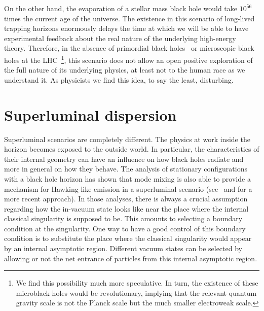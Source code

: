 \documentclass[11pt,a4paper]{article}
\begin{document}
On the other hand, the evaporation of a stellar mass black hole would take $10^{56}$
times the current age of the universe. The existence in this scenario of long-lived
trapping horizons enormously delays the time at which we will be able to have
experimental feedback about the real nature of the underlying high-energy theory.
Therefore, in the absence of primordial black holes~\cite{Carr:2009jm} or
microscopic black holes at the LHC~\cite{Khachatryan:2010wx}\footnote{We find this
possibility much more speculative. In turn, the existence of these microblack holes
would be revolutionary, implying that the relevant quantum gravity scale is not the
Planck scale but the much smaller electroweak scale.}, this scenario does not allow
an open positive exploration of the full nature of its underlying physics, at least
not to the human race as we understand it. As physicists we find this idea, to say
the least, disturbing.

\section{Superluminal dispersion}
\label{Sec:Super}
    
Superluminal scenarios are completely different. 
The physics at work inside the horizon becomes exposed to the outside world.
In particular, the characteristics of their internal geometry can have 
an influence on how black holes radiate and more in general on how they behave.
The analysis of stationary configurations with a black hole horizon has shown that
mode mixing is also able to provide a mechanism for Hawking-like emission in a
superluminal scenario (see~\cite{Corley:1997pr} and \cite{macher-parentani} for a
more recent approach). In those analyses, there is always a crucial assumption
regarding how the in-vacuum state looks like near the place where the internal
classical singularity is supposed to be. This amounts to selecting a boundary
condition at the singularity. One way to have a good control of this boundary
condition is to substitute the place where the classical singularity would appear by
an internal asymptotic region. Different vacuum states can be selected by allowing
or not the net entrance of particles from this internal asymptotic region.  
\end{document}
